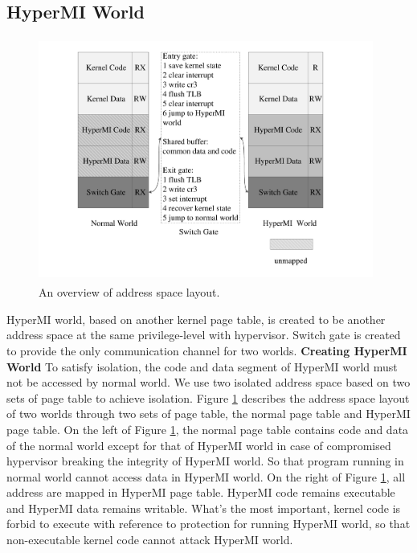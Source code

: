 \documentclass[conference]{IEEEtran}
\begin{document}
\subsection{HyperMI World} \label {HWorld}
\begin{figure}
\centerline{\includegraphics[width=11cm, height=8cm]{pdfvmcs2.pdf}}%
\caption{An overview of address space layout.} \label{fig2}
\end{figure}
HyperMI world, based on another kernel page table, is created to be another address space at the same privilege-level with hypervisor. %
Switch gate is created to provide the only communication channel for two worlds.
\textbf{Creating HyperMI World}
To satisfy isolation, the code and data segment of HyperMI world must not be accessed by normal world. We use two isolated address space based on two sets of page table to achieve isolation.
Figure \ref{fig2} describes the address space layout of two worlds through two sets of page table, the normal page table and HyperMI page table. On the left of Figure \ref{fig2}, the normal page table contains code and data of the normal world except for that of HyperMI world in case of compromised hypervisor breaking the integrity of HyperMI world. So that program running in normal world cannot access data in HyperMI world. On the right of Figure \ref{fig2}, all address are mapped in HyperMI page table.
HyperMI code remains executable and HyperMI data remains writable. What's the most important, kernel code is forbid to execute with reference to protection for running HyperMI world, so that non-executable kernel code cannot attack HyperMI world.
\end{document}
